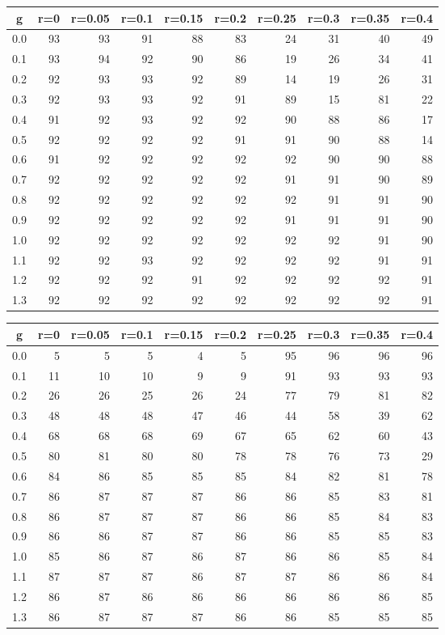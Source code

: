 %
\begin{table}[!tbp]
 \begin{center}
 \begin{tabular}{rrrrrrrrrr}\hline\hline
\multicolumn{1}{c}{g}&\multicolumn{1}{c}{r=0}&\multicolumn{1}{c}{r=0.05}&\multicolumn{1}{c}{r=0.1}&\multicolumn{1}{c}{r=0.15}&\multicolumn{1}{c}{r=0.2}&\multicolumn{1}{c}{r=0.25}&\multicolumn{1}{c}{r=0.3}&\multicolumn{1}{c}{r=0.35}&\multicolumn{1}{c}{r=0.4}\tabularnewline
\hline
0.0&93&93&91&88&83&24&31&40&49\tabularnewline
0.1&93&94&92&90&86&19&26&34&41\tabularnewline
0.2&92&93&93&92&89&14&19&26&31\tabularnewline
0.3&92&93&93&92&91&89&15&81&22\tabularnewline
0.4&91&92&93&92&92&90&88&86&17\tabularnewline
0.5&92&92&92&92&91&91&90&88&14\tabularnewline
0.6&91&92&92&92&92&92&90&90&88\tabularnewline
0.7&92&92&92&92&92&91&91&90&89\tabularnewline
0.8&92&92&92&92&92&92&91&91&90\tabularnewline
0.9&92&92&92&92&92&91&91&91&90\tabularnewline
1.0&92&92&92&92&92&92&92&91&90\tabularnewline
1.1&92&92&93&92&92&92&92&91&91\tabularnewline
1.2&92&92&92&91&92&92&92&92&91\tabularnewline
1.3&92&92&92&92&92&92&92&92&91\tabularnewline
\hline
\end{tabular}

\end{center}

\end{table}

%
\begin{table}[!tbp]
 \begin{center}
 \begin{tabular}{rrrrrrrrrr}\hline\hline
\multicolumn{1}{c}{g}&\multicolumn{1}{c}{r=0}&\multicolumn{1}{c}{r=0.05}&\multicolumn{1}{c}{r=0.1}&\multicolumn{1}{c}{r=0.15}&\multicolumn{1}{c}{r=0.2}&\multicolumn{1}{c}{r=0.25}&\multicolumn{1}{c}{r=0.3}&\multicolumn{1}{c}{r=0.35}&\multicolumn{1}{c}{r=0.4}\tabularnewline
\hline
0.0& 5& 5& 5& 4& 5&95&96&96&96\tabularnewline
0.1&11&10&10& 9& 9&91&93&93&93\tabularnewline
0.2&26&26&25&26&24&77&79&81&82\tabularnewline
0.3&48&48&48&47&46&44&58&39&62\tabularnewline
0.4&68&68&68&69&67&65&62&60&43\tabularnewline
0.5&80&81&80&80&78&78&76&73&29\tabularnewline
0.6&84&86&85&85&85&84&82&81&78\tabularnewline
0.7&86&87&87&87&86&86&85&83&81\tabularnewline
0.8&86&87&87&87&86&86&85&84&83\tabularnewline
0.9&86&86&87&87&86&86&85&85&83\tabularnewline
1.0&85&86&87&86&87&86&86&85&84\tabularnewline
1.1&87&87&87&86&87&87&86&86&84\tabularnewline
1.2&86&87&86&86&86&86&86&86&85\tabularnewline
1.3&86&87&87&87&86&86&85&85&85\tabularnewline
\hline
\end{tabular}

\end{center}

\end{table}

